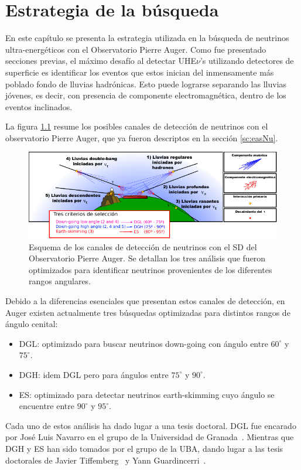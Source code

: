 \chapter{Estrategia de la búsqueda}
\label{ch:estrategiaAuger}

En este capítulo se presenta la estrategia utilizada en la búsqueda de neutrinos ultra-energéticos con el Observatorio Pierre Auger.
Como fue presentado secciones previas, el m\'aximo desafío al detectar UHE$\nu$'s utilizando detectores de superficie es identificar los eventos que estos inician del inmensamente más poblado fondo de lluvias hadrónicas.
Esto puede lograrse separando las lluvias jóvenes, es decir, con presencia de componente electromagn\'etica, dentro de los eventos inclinados.

La figura \ref{fig:augerNu} resume los posibles canales de detección de neutrinos con el observatorio Pierre Auger, que ya fueron descriptos en la sección \ref{sc:easNu}.
	\begin{figure}[ht!]
		\centering
		\includegraphics[width=\textwidth]{./fig/estrategiaAuger/auger_nu}
		\caption{\label{fig:augerNu}
		Esquema de los canales de detección de neutrinos con el SD del Observatorio Pierre Auger. Se detallan los tres análisis que fueron optimizados para identificar neutrinos provenientes de los diferentes rangos angulares.
		}
	\end{figure}
Debido a la diferencias esenciales que presentan estos canales de detección, en Auger existen actualmente tres búsquedas optimizadas para distintos rangos de ángulo cenital:
\begin{itemize}
 \item DGL: optimizado para buscar neutrinos down-going con ángulo entre $60^\circ$ y $75^\circ$.
 \item DGH: idem DGL pero para ángulos entre $75^\circ$ y $90^\circ$. 
 \item ES: optimizado para detectar neutrinos earth-skimming cuyo ángulo se encuentre entre $90^\circ$ y $95^\circ$.
\end{itemize}
%
Cada uno de estos an\'alisis ha dado lugar a una tesis doctoral. DGL fue encarado por Jos\'e Luis Navarro en el grupo de la Universidad de Granada~\cite{cite:tesisNavarro}. Mientras que DGH y ES han sido tomados por el grupo de la UBA, dando lugar a las tesis doctorales de Javier Tiffemberg~\cite{cite:tesisJavier} y Yann Guardincerri~\cite{cite:tesisYann}.

